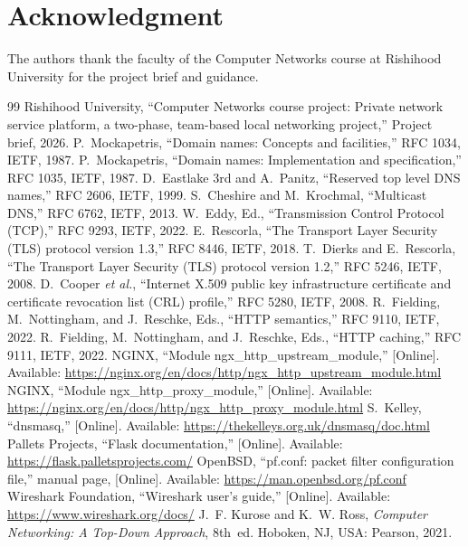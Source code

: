 \documentclass[conference,a4paper]{IEEEtran}
\begin{document}
\section*{Acknowledgment}
The authors thank the faculty of the Computer Networks course at Rishihood University for the
project brief and guidance.

\begin{thebibliography}{99}
 Rishihood University, ``Computer Networks course project: Private network service
platform, a two-phase, team-based local networking project,'' Project brief, 2026.
 P.~Mockapetris, ``Domain names: Concepts and facilities,'' RFC 1034, IETF, 1987.
 P.~Mockapetris, ``Domain names: Implementation and specification,'' RFC 1035,
IETF, 1987.
 D.~Eastlake 3rd and A.~Panitz, ``Reserved top level DNS names,'' RFC 2606, IETF,
1999.
 S.~Cheshire and M.~Krochmal, ``Multicast DNS,'' RFC 6762, IETF, 2013.
 W.~Eddy, Ed., ``Transmission Control Protocol (TCP),'' RFC 9293, IETF, 2022.
 E.~Rescorla, ``The Transport Layer Security (TLS) protocol version 1.3,''
RFC 8446, IETF, 2018.
 T.~Dierks and E.~Rescorla, ``The Transport Layer Security (TLS) protocol version
1.2,'' RFC 5246, IETF, 2008.
 D.~Cooper \emph{et al.}, ``Internet X.509 public key infrastructure certificate
and certificate revocation list (CRL) profile,'' RFC 5280, IETF, 2008.
 R.~Fielding, M.~Nottingham, and J.~Reschke, Eds., ``HTTP semantics,'' RFC 9110,
IETF, 2022.
 R.~Fielding, M.~Nottingham, and J.~Reschke, Eds., ``HTTP caching,'' RFC 9111,
IETF, 2022.
 NGINX, ``Module ngx\_http\_upstream\_module,'' [Online]. Available:
\url{https://nginx.org/en/docs/http/ngx_http_upstream_module.html}
 NGINX, ``Module ngx\_http\_proxy\_module,'' [Online]. Available:
\url{https://nginx.org/en/docs/http/ngx_http_proxy_module.html}
 S.~Kelley, ``dnsmasq,'' [Online]. Available:
\url{https://thekelleys.org.uk/dnsmasq/doc.html}
 Pallets Projects, ``Flask documentation,'' [Online]. Available:
\url{https://flask.palletsprojects.com/}
 OpenBSD, ``pf.conf: packet filter configuration file,'' manual page, [Online].
Available: \url{https://man.openbsd.org/pf.conf}
 Wireshark Foundation, ``Wireshark user's guide,'' [Online]. Available:
\url{https://www.wireshark.org/docs/}
 J.~F. Kurose and K.~W. Ross, \emph{Computer Networking: A Top-Down Approach},
8th~ed. Hoboken, NJ, USA: Pearson, 2021.
\end{thebibliography}
\end{document}
